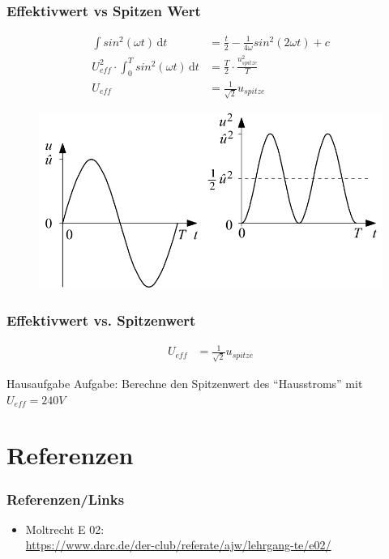 \begin{frame}
  \frametitle{Effektivwert vs Spitzen Wert}
  \begin{align}
    \int \! sin^2(\omega t) \, \mathrm{d}t & = \frac{t}{2} - \frac{1}{4\omega}sin^2(2\omega t) + c \\
    U_{eff}^2 \cdot \int_0^T \! sin^2(\omega t) \, \mathrm{d}t & = \frac{T}{2} \cdot \frac{u_{spitze}^2}{T} \\
    U_{eff} & = \frac{1}{\sqrt{2}} u_{spitze}
  \end{align}
  \begin{center}
    \begin{figure}
      \includegraphics[width=.6\textwidth,height=.3\textheight,keepaspectratio]{e02/EffektivwertSinus.png}\\
    \end{figure}
  \end{center}
\end{frame}

\begin{frame}
  \frametitle{Effektivwert vs. Spitzenwert}
  \begin{align}
    U_{eff} & = \frac{1}{\sqrt{2}} u_{spitze}
  \end{align}
  \begin{alertblock}{Hausaufgabe}
    Aufgabe: Berechne den Spitzenwert des ``Hausstroms'' mit $U_{eff} = 240V$
  \end{alertblock}
\end{frame}

\section*{Referenzen}

\begin{frame}
  \frametitle{Referenzen/Links}

  \footnotesize
  \begin{itemize}
    \item Moltrecht E 02: \\
      \url{https://www.darc.de/der-club/referate/ajw/lehrgang-te/e02/}
  \end{itemize}

\end{frame}


